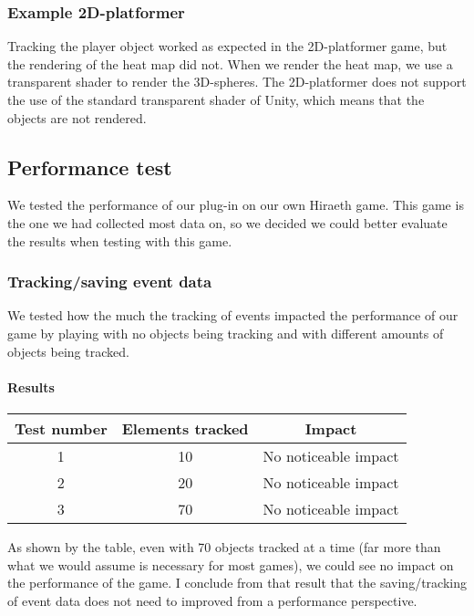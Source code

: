 \subsubsection{Example 2D-platformer}
\label{Test_TG_2D}
Tracking the player object worked as expected in the 2D-platformer game, but the rendering of the heat map did not. When we render the heat map, we use a transparent shader to render the 3D-spheres. The 2D-platformer does not support the use of the standard transparent shader of Unity, which means that the objects are not rendered.

\subsection{Performance test}
\label{Test_P}
We tested the performance of our plug-in on our own Hiraeth game. This game is the one we had collected most data on, so we decided we could better evaluate the results when testing with this game.

\subsubsection{Tracking/saving event data}
\label{Test_P_Saving}
We tested how the much the tracking of events impacted the performance of our game by playing with no objects being tracking and with different amounts of objects being tracked.

\paragraph{Results}
\begin{center}
\begin{tabular}{| c | c | c |}
\hline
Test number & Elements tracked & Impact \\ 
\hline
1 & 10 & No noticeable impact \\ 
\hline
2 & 20 & No noticeable impact \\ 
\hline
3 & 70 & No noticeable impact \\
\hline
\end{tabular}
\end{center}

As shown by the table, even with 70 objects tracked at a time (far more than what we would assume is necessary for most games), we could see no impact on the performance of the game. I conclude from that result that the saving/tracking of event data does not need to improved from a performance perspective.

